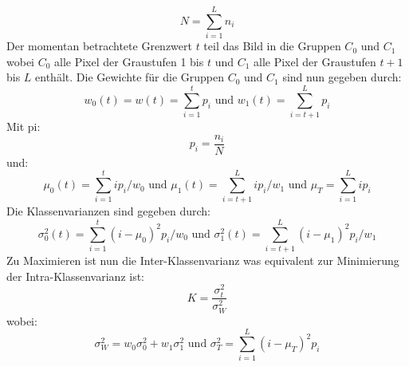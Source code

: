 \begin{equation}
    N = \sum_{i=1}^{L} n_i
\end{equation}
Der momentan betrachtete Grenzwert $t$ teil das Bild in die Gruppen $C_0$ und $C_1$ wobei $C_0$ alle Pixel der Graustufen 1 bis $t$ und 
$C_1$ alle Pixel der Graustufen $t+1$ bis $L$ enthält. Die Gewichte für die Gruppen $C_0$ und $C_1$ sind nun gegeben durch:
\begin{equation}
    w_0(t) = w(t) = \sum_{i=1}^{t} p_i
    \text{   und   }
    w_1(t) = \sum_{i=t+1}^{L} p_i
\end{equation}
Mit pi:
\begin{equation}
    p_i = \frac{n_i}{N}
\end{equation}
und:
\begin{equation}
    \mu_0(t) = \sum_{i=1}^{t} ip_i/w_0
    \text{   und   }
    \mu_1(t) = \sum_{i=t+1}^{L} ip_i/w_1
    \text{   und   }
    \mu_T = \sum_{i=1}^{L} ip_i
\end{equation}
Die Klassenvarianzen sind gegeben durch:
\begin{equation}
    \sigma_0^2(t) =  \sum_{i=1}^{t} (i-\mu_0)^2p_i/w_0
    \text{   und   }
    \sigma_1^2(t) = \sum_{i=t+1}^{L} (i-\mu_1)^2p_i/w_1
\end{equation}
Zu Maximieren ist nun die Inter-Klassenvarianz was equivalent zur Minimierung der Intra-Klassenvarianz ist:
\begin{equation}
    K = \frac{\sigma_t^2}{\sigma_W^2}
\end{equation}
wobei: 
\begin{equation}
    \sigma_W^2 = w_0\sigma_0^2 + w_1\sigma_1^2
    \text{   und   }
    \sigma_T^2 = \sum_{i=1}^{L} (i-\mu_T)^2p_i
\end{equation}
